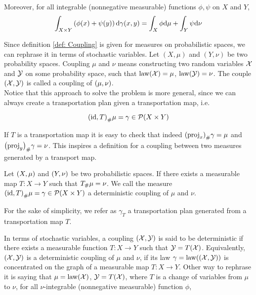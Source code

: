 Moreover, for all integrable (nonnegative measurable) functions $\phi, \psi$ on $X$ and $Y$,
\begin{equation*}
	\int_{X\times Y}\left( \phi(x)+\psi(y) \right)\mathrm{d}\gamma(x,y)=\int_{X}\phi\mathrm{d}\mu+\int_{Y}\psi\mathrm{d}\nu
\end{equation*}

Since definition \ref{def: Coupling} is given for measures on probabilistic spaces, we can rephrase it in terms of stochastic variables. Let $(X, \mu)$ and $(Y, \nu)$ be two probability spaces. Coupling $\mu$ and $\nu$ means constructing two random variables $\mathcal{X}$ and $\mathcal{Y}$ on some probability space, such that $\mathrm{law}(\mathcal{X})=\mu$, $\mathrm{law}(\mathcal{Y})=\nu$. The couple $\left( \mathcal{X},\mathcal{Y} \right)$ is called a coupling of $\left( \mu, \nu \right)$. \\

Notice that this approach to solve the problem is more general, since we can always create a transportation plan given a transportation map, i.e. 

\begin{equation*}
{(\mathrm{id}, T)}_{\#} \mu=\gamma \in \mathcal{P}(X\times Y)
\end{equation*}

If $T$ is a transportation map it is easy to check that indeed ${\left( \mathrm{proj}_x \right)}_{\#} \gamma=\mu$ and ${\left( \mathrm{proj}_y \right)}_{\#} \gamma=\nu$.  This inspires a definition for a coupling between two measures generated by a transport map. \\


\begin{definition}
Let $\left( X, \mu \right)$ and $\left( Y, \nu \right)$ be two probabilistic spaces. If there exists a measurable map $T:X\rightarrow Y$ such that ${T}_{\#} \mu=\nu$. We call the measure ${\left( \mathrm{id}, T \right)}_{\#} \mu=\gamma \in \mathcal{P}(X\times Y)$ a deterministic coupling of $\mu$ and $\nu$.
\end{definition}

For the sake of simplicity, we refer as $\gamma_T$ a transportation plan generated from a transportation map $T$.


In terms of stochastic variables, a coupling $(\mathcal{X},\mathcal{Y})$ is said to be deterministic if there exists a measurable function $T: X \rightarrow Y$ such that $\mathcal{Y} = T(\mathcal{X})$. Equivalently, $\left( \mathcal{X}, \mathcal{Y} \right)$ is a deterministic coupling of $\mu$ and $\nu$, if its law $\gamma=\mathrm{law}(\left( \mathcal{X},\mathcal{Y} \right))$ is concentrated on the graph of a measurable map $T:X\rightarrow Y$. Other way to rephrase it is saying that $\mu=\mathrm{law}(\mathcal{X})$, $\mathcal{Y}=T(\mathcal{X})$, where $T$ is a change of variables from $\mu$ to $\nu$, for all $\nu$-integrable (nonnegative measurable)  function $\phi$,

